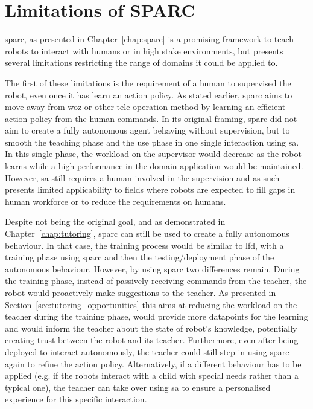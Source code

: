 \section{Limitations of SPARC} \label{sec:disc_limitations}

\gls{sparc}, as presented in Chapter~\ref{chap:sparc} is a promising framework to teach robots to interact with humans or in high stake environments, but presents several limitations restricting the range of domains it could be applied to.

The first of these limitations is the requirement of a human to supervised the robot, even once it has learn an action policy. As stated earlier, \gls{sparc} aims to move away from \gls{woz} or other tele-operation method by learning an efficient action policy from the human commands. In its original framing, \gls{sparc} did not aim to create a fully autonomous agent behaving without supervision, but to smooth the teaching phase and the use phase in one single interaction using \gls{sa}. In this single phase, the workload on the supervisor would decrease as the robot learns while a high performance in the domain application would be maintained. However, \gls{sa} still requires a human involved in the supervision and as such presents limited applicability to fields where robots are expected to fill gaps in human workforce or to reduce the requirements on humans. 

Despite not being the original goal, and as demonstrated in Chapter~\ref{chap:tutoring}, \gls{sparc} can still be used to create a fully autonomous behaviour. In that case, the training process would be similar to \gls{lfd}, with a training phase using \gls{sparc} and then the testing/deployment phase of the autonomous behaviour. However, by using \gls{sparc} two differences remain. During the training phase, instead of passively receiving commands from the teacher, the robot would proactively make suggestions to the teacher. As presented in Section~\ref{sec:tutoring_opportunities} this aims at reducing the workload on the teacher during the training phase, would provide more datapoints for the learning and would inform the teacher about the state of robot's knowledge, potentially creating trust between the robot and its teacher. Furthermore, even after being deployed to interact autonomously, the teacher could still step in using \gls{sparc} again to refine the action policy. Alternatively, if a different behaviour has to be applied (e.g. if the robots interact with a child with special needs rather than a typical one), the teacher can take over using \gls{sa} to ensure a personalised experience for this specific interaction.

